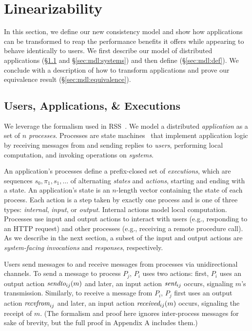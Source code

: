 \section{\Multidispatch{} Linearizability}
\label{sec:mdl}

In this section, we define our new consistency model and show how
applications can be transformed to reap the performance benefits it offers while appearing to behave identically to users.
We first describe our model of distributed applications
(\S\ref{sec:mdl:applications} and \S\ref{sec:mdl:systems}) and then define \MDL{} (\S\ref{sec:mdl:def}). We conclude with a description
of how to transform applications and prove our equivalence result
(\S\ref{sec:mdl:equivalence}).

\subsection{Users, Applications, \& Executions}
\label{sec:mdl:applications}

We leverage the formalism used in RSS~\cite{helt2021rss}. We model a
distributed \textit{application} as a set of $n$ \textit{processes}.
Processes are state machines~\cite{lynch1987ioa,lynch1996da}
that implement application logic by receiving messages from and sending replies
to \textit{users}, performing local computation,
and invoking operations on \textit{systems}.

An application's processes define a prefix-closed set of \textit{executions},
which are sequences $s_0,\pi_1,s_1,\ldots$ of alternating \textit{states} and
\textit{actions}, starting and ending with a state. An application's state
is an $n$-length vector containing the state of each process.
%
Each action is a step taken by exactly one process and is one of three types:
\textit{internal}, \textit{input}, or \textit{output}. Internal actions model
local computation. Processes use input and output actions to interact with
users (e.g., responding to an HTTP request) and other
processes (e.g., receiving a remote procedure call).
As we describe in the next section, a subset of the input and output actions
are \textit{system-facing} \textit{invocations} and \textit{responses}, 
respectively.

Users send messages to and receive messages from processes via unidirectional
channels. To send a message to process $P_j$, $P_i$ uses two
actions: first, $P_i$ uses an output action $\operatorname*{\operatorname*{\textit{sendto}}}_{ij}(m)$
and later, an input action $\operatorname*{\textit{sent}}_{ij}$ occurs, signaling $m$'s 
transmission. Similarly, to receive a message from $P_i$, $P_j$ first
uses an output action $\operatorname*{\textit{recvfrom}}_{ij}$ and later, an input action
$\operatorname*{\textit{received}}_{ij}(m)$ occurs, signaling the receipt of $m$.
(The formalism and proof here ignores inter-process messages for sake of brevity, but the full
proof in Appendix A includes them.)


